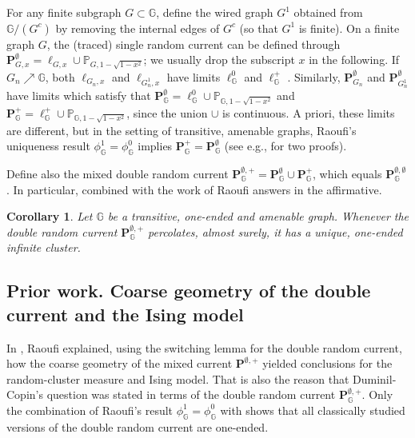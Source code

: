 \documentclass[article,11pt,reqno]{amsart}
\newcommand{\Prbcur}{\mathbf{P}}
\newtheorem{corollary}[theorem]{Corollary}
\begin{document}
For any finite subgraph $G \subset \mathbb{G}$, define the wired graph $G^1$ obtained from $\mathbb{G}/(G^c)$ by removing the internal edges of $G^c$ (so that $G^1$ is finite).
On a finite graph $G$, the (traced) single random current  can be defined through $\Prbcur_{G,x}^\emptyset = \ell_{G,x} \cup \mathbb{P}_{G,1 - \sqrt{1-x^2}}$; we usually drop the subscript $x$ in the following.
If $G_n \nearrow \mathbb{G}$, both  $\ell_{G_n,x}$ and $\ell_{G_n^1,x}$ have limits $\ell^0_{\mathbb{G}}$ and $\ell^+_{\mathbb{G}}$ \cite{aizenman2015random}. 
Similarly, $\Prbcur_{G_n}^\emptyset$ and $\Prbcur_{G^1_n}^\emptyset$ have limits  which satisfy that $\Prbcur_{\mathbb{G}}^\emptyset = \ell_{\mathbb{G}}^0 \cup \mathbb{P}_{\mathbb{G},1 - \sqrt{1-x^2}}$ and $\Prbcur_{\mathbb{G}}^+ = \ell_{\mathbb{G}}^+ \cup \mathbb{P}_{\mathbb{G},1 - \sqrt{1-x^2}}$, since the union $\cup$ is continuous. A priori, these limits are different, but in the setting of transitive, amenable graphs, Raoufi's uniqueness result $\phi_\mathbb{G}^1 = \phi_\mathbb{G}^0$  implies  $\Prbcur_\mathbb{G}^+ =\Prbcur_\mathbb{G}^\emptyset$ (see e.g., \cite[Appendix A]{hansen2026supercriticalloopo1random} for two proofs).

Define also the mixed double random current $\Prbcur_{\mathbb{G}}^{\emptyset,+} = \Prbcur_{\mathbb{G}}^\emptyset \cup \Prbcur_{\mathbb{G}}^+$, which equals $\Prbcur_{\mathbb{G}}^{\emptyset,\emptyset}$. In particular,   combined with the work of Raoufi \cite{raoufi2020translation}  answers \cite[Question 8]{DC16} in the affirmative. 
\begin{corollary}\label{cor:question}
    Let $\mathbb{G}$ be a transitive, one-ended and amenable graph. Whenever the double random current $\Prbcur^{\emptyset,+}_{\mathbb{G}}$  percolates, almost surely, it has a unique, one-ended infinite cluster.
\end{corollary}



\subsection{Prior work. Coarse geometry of the double current and the Ising model}



In \cite{raoufi2020translation}, Raoufi explained, using the switching lemma for the double random current, how the coarse geometry of the mixed current $\Prbcur^{\emptyset,+}$ yielded conclusions for the random-cluster measure and Ising model.
That is also the reason that Duminil-Copin's question  was stated in terms of the double random current $\Prbcur_{\mathbb{G}}^{\emptyset,+}$.
Only the combination of Raoufi's result $\phi_\mathbb{G}^1 = \phi_\mathbb{G}^0$ with  shows that all classically studied versions of the double random current are one-ended.
\end{document}
